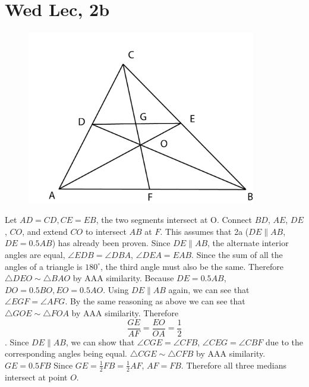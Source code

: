 \documentclass[12pt]{article}
\newcommand{\degrees}{^{\circ}}
\begin{document}
\section{Wed Lec, 2b}
\begin{figure}[h]
    \includegraphics[width = 100mm]{GRAPH3.png}
\end{figure}
Let $AD = CD, CE = EB$, the two segments intersect at O. Connect $BD$, $AE$, $DE$, $CO$, and extend $CO$ to intersect $AB$ at $F$.
\newline
This assumes that 2a ($DE \parallel AB$, $DE = 0.5AB$) has already been proven.
\newline
Since $DE \parallel AB$, the alternate interior angles are equal, $\angle EDB = \angle DBA$, $\angle DEA = EAB$. Since the sum of all the angles of a triangle is $180 \degrees$, the third angle must also be the same. Therefore $\triangle DEO \sim \triangle BAO$ by AAA similarity.
\newline
Because $DE = 0.5AB$, $DO = 0.5BO, EO = 0.5 AO$.
\newline
Using $DE \parallel AB$ again, we can see that $\angle EGF = \angle AFG$. By the same reasoning as above we can see that $\triangle GOE \sim \triangle FOA$ by AAA similarity. Therefore $$\frac{GE}{AF} = \frac{EO}{OA} = \frac{1}{2}$$.
Since $DE \parallel AB$, we can show that $\angle CGE = \angle CFB$, $\angle CEG = \angle CBF$ due to the corresponding angles being equal. $\triangle CGE \sim \triangle CFB$ by AAA similarity. $GE = 0.5FB$
\newline
Since $GE = \frac{1}{2}FB = \frac{1}{2}AF$, $AF = FB$. Therefore all three medians intersect at point $O$.
\newpage
\end{document}
